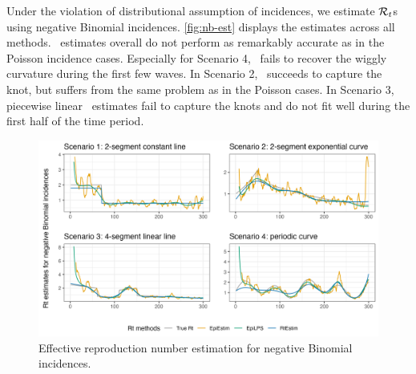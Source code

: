 Under the violation of distributional assumption of incidences, we estimate $\mathcal{R}_t$s using negative Binomial incidences. \autoref{fig:nb-est} displays the estimates across all methods. \RtEstim\ estimates overall do not perform as remarkably accurate as in the Poisson incidence cases. Especially for Scenario 4, \RtEstim\ fails to recover the wiggly curvature during the first few waves. In Scenario 2, \RtEstim\ succeeds to capture the knot, but suffers from the same problem as in the Poisson cases. In Scenario 3, piecewise linear \RtEstim\ estimates fail to capture the knots and do not fit well during the first half of the time period. 
\begin{figure}[tb]
    \centering
    \includegraphics*[width=160mm]{fig/NB-res-plot.png}
    \caption{Effective reproduction number estimation for negative Binomial incidences.} 
    \label{fig:nb-est}
\end{figure}

